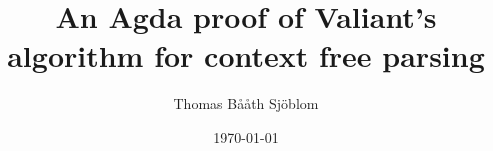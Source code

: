 \documentclass{article}
\begin{document}
\title{An Agda proof of Valiant's algorithm for context free parsing}
\author{Thomas Bååth Sjöblom}
\date{\today}
\maketitle
\newpage
\tableofcontents

\listoftodos


\end{document}
